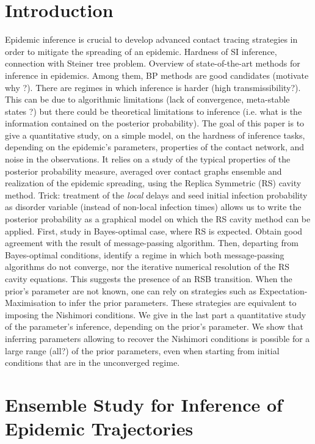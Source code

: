 \documentclass[a4paper, amsfonts, amssymb, amsmath, reprint, showkeys, nofootinbib, twoside, floatfix, pre,superscriptaddress]{revtex4-2}
\begin{document}
\section{Introduction}
Epidemic inference is crucial to develop advanced contact tracing strategies in order to mitigate the spreading of an epidemic.
Hardness of SI inference, connection with Steiner tree problem.
Overview of state-of-the-art methods for inference in epidemics. Among them, BP methods are good candidates (motivate why ?).
There are regimes in which inference is harder (high transmissibility?). 
This can be due to algorithmic limitations (lack of convergence, meta-stable states ?) but there could be theoretical limitations to inference (i.e. what is the information contained on the posterior probability).
The goal of this paper is to give a quantitative study, on a simple model, on the hardness of inference tasks, depending on the epidemic's parameters, properties of the contact network, and noise in the observations.
It relies on a study of the typical properties of the posterior probability measure, averaged over contact graphs ensemble and realization of the epidemic spreading, using the Replica Symmetric (RS) cavity method. 
Trick: treatment of the {\it local} delays and seed initial infection probability as disorder variable (instead of non-local infection times) allows us to write the posterior probability as a graphical model on which the RS cavity method can be applied.
First, study in Bayes-optimal case, where RS is expected. Obtain good agreement with the result of message-passing algorithm.
Then, departing from Bayes-optimal conditions, identify a regime in which both message-passing algorithms do not converge, nor the iterative numerical resolution of the RS cavity equations. This suggests the presence of an RSB transition.
When the prior's parameter are not known, one can rely on strategies such as Expectation-Maximisation to infer the prior parameters. These strategies are equivalent to imposing the Nishimori conditions.
We give in the last part a quantitative study of the parameter's inference, depending on the prior's parameter. We show that inferring parameters allowing to recover the Nishimori conditions is possible for a large range (all?) of the prior parameters, even when starting from initial conditions that are in the unconverged regime.


\section{Ensemble Study for Inference of Epidemic Trajectories}
\end{document}
